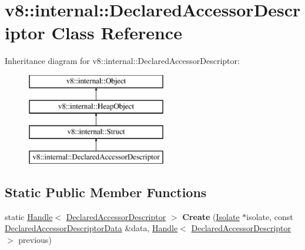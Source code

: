 \hypertarget{classv8_1_1internal_1_1_declared_accessor_descriptor}{}\section{v8\+:\+:internal\+:\+:Declared\+Accessor\+Descriptor Class Reference}
\label{classv8_1_1internal_1_1_declared_accessor_descriptor}
Inheritance diagram for v8\+:\+:internal\+:\+:Declared\+Accessor\+Descriptor\+:\begin{figure}[H]
\begin{center}
\leavevmode
\includegraphics[height=4.000000cm]{classv8_1_1internal_1_1_declared_accessor_descriptor}
\end{center}
\end{figure}
\subsection*{Static Public Member Functions}
\begin{DoxyCompactItemize}
\item 
\hypertarget{classv8_1_1internal_1_1_declared_accessor_descriptor_a32e6dea9e3a726de0f1b1e08d01119fb}{}static \hyperlink{classv8_1_1internal_1_1_handle}{Handle}$<$ \hyperlink{classv8_1_1internal_1_1_declared_accessor_descriptor}{Declared\+Accessor\+Descriptor} $>$ {\bfseries Create} (\hyperlink{classv8_1_1internal_1_1_isolate}{Isolate} $\ast$isolate, const \hyperlink{structv8_1_1internal_1_1_declared_accessor_descriptor_data}{Declared\+Accessor\+Descriptor\+Data} \&data, \hyperlink{classv8_1_1internal_1_1_handle}{Handle}$<$ \hyperlink{classv8_1_1internal_1_1_declared_accessor_descriptor}{Declared\+Accessor\+Descriptor} $>$ previous)\label{classv8_1_1internal_1_1_declared_accessor_descriptor_a32e6dea9e3a726de0f1b1e08d01119fb}

\end{DoxyCompactItemize}
